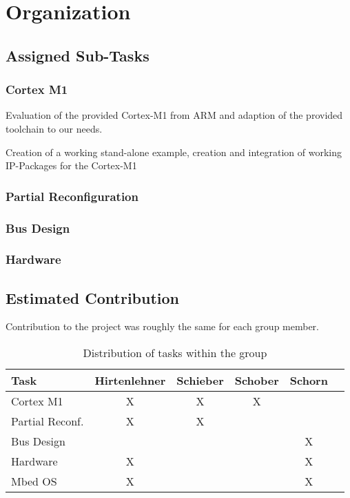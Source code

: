 \section{Organization}

\subsection{Assigned Sub-Tasks}
 \subsubsection{Cortex M1} 
 Evaluation of the provided Cortex-M1 from ARM and adaption of the provided toolchain to our needs. 

 Creation of a working stand-alone example, creation and integration of working IP-Packages for the Cortex-M1
 \subsubsection{Partial Reconfiguration} 
 \subsubsection{Bus Design}
 \subsubsection{Hardware}   
\subsection{Estimated Contribution}
Contribution to the project was roughly the same for each group member.
    \begin{table}
        \centering
\begin{tabular}{ l | c c c c c}
 Task & Hirtenlehner & Schieber & Schober & Schorn\\ 
 \hline
Cortex M1       & X & X & X & \\
Partial Reconf. & X & X & & \\
Bus Design      & & & & X\\
Hardware        & X & & & X\\
Mbed OS         & X & & & X\\
\end{tabular}
\caption{Distribution of tasks within the group}
\end{table}